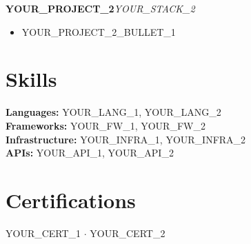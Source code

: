 \documentclass[10pt,a4paper]{article}
\newcommand{\entry}[2]{\textbf{#1}\hfill\textit{#2}\\}
\begin{document}
\entry{YOUR_PROJECT_2}{YOUR_STACK_2}
\begin{itemize}
  \item YOUR_PROJECT_2_BULLET_1
\end{itemize}

\section*{Skills}
\textbf{Languages:} YOUR_LANG_1, YOUR_LANG_2\\
\textbf{Frameworks:} YOUR_FW_1, YOUR_FW_2\\
\textbf{Infrastructure:} YOUR_INFRA_1, YOUR_INFRA_2\\
\textbf{APIs:} YOUR_API_1, YOUR_API_2

\section*{Certifications}
YOUR_CERT_1 $\cdot$ YOUR_CERT_2
\end{document}
